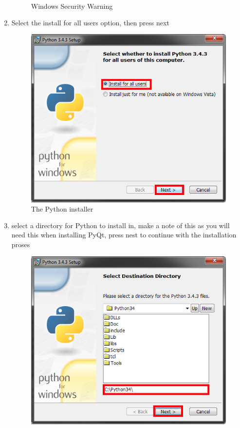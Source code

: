 \begin{enumerate}
\begin{figure}[H]
\caption{Windows Security Warning} \label{fig:PyISP3}
\end{figure}
\item Select the install for all users option, then press next
\begin{figure}[H]
\includegraphics[width=\textwidth]{./Manual/PythonInstall/Part4.png}
\caption{The Python installer} \label{fig:PyISP4}
\end{figure}
\item select a directory for Python to install in, make a note of this as you will need this when installing PyQt, press nest to continue with the installation proses
\begin{figure}[H]
\includegraphics[width=\textwidth]{./Manual/PythonInstall/Part5.png}

\end{figure}
\end{enumerate}
